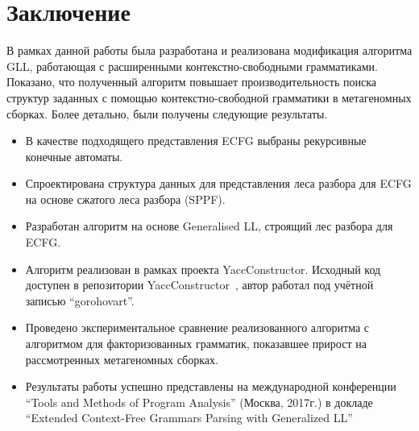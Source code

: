 \documentclass[14pt]{matmex-diploma-custom}
\begin{document}
	\section*{Заключение}
	В рамках данной работы была разработана и реализована модификация алгоритма GLL,
	работающая с расширенными контекстно-свободными грамматиками. Показано, что полученный
	алгоритм повышает производительность поиска структур заданных с помощью контекстно-свободной
	грамматики в метагеномных сборках. Более детально, были получены следующие результаты.
	\begin{itemize}
		\item В качестве подходящего представления ECFG выбраны рекурсивные конечные автоматы.
		\item Спроектирована структура данных для представления леса разбора для ECFG 
		на основе сжатого леса разбора (SPPF).
		\item Разработан алгоритм на основе Generalised LL, строящий лес разбора для ECFG.
		\item Алгоритм реализован в рамках проекта YaccConstructor. Исходный код доступен в
              репозитории YaccConstructor~\cite{YCUrl}, автор работал под учётной записью ``gorohovart''.
		\item Проведено экспериментальное сравнение реализованного алгоритма с алгоритмом для факторизованных грамматик,
         показавшее прирост на рассмотренных метагеномных сборках.
		\item Результаты работы успешно представлены на международной конференции
		``Tools and Methods of Program Analysis'' (Москва, 2017г.) в докладе ``Extended Context-Free Grammars Parsing with Generalized LL''
	\end{itemize}
	
	\setmonofont[Mapping=tex-text]{CMU Typewriter Text}
	
	
	
\end{document}
